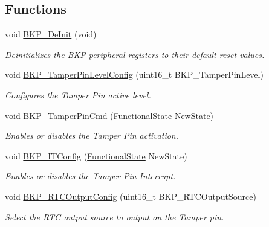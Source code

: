 \subsection*{Functions}
\begin{DoxyCompactItemize}
\item 
void \hyperlink{group___b_k_p___exported___functions_gaabff4d8f5ebf4fd9a840bcc9042ca226}{B\+K\+P\+\_\+\+De\+Init} (void)
\begin{DoxyCompactList}\small\item\em Deinitializes the B\+KP peripheral registers to their default reset values. \end{DoxyCompactList}\item 
void \hyperlink{group___b_k_p___exported___functions_gae216446d641d075fb575ce6dbe2ff4c1}{B\+K\+P\+\_\+\+Tamper\+Pin\+Level\+Config} (uint16\+\_\+t B\+K\+P\+\_\+\+Tamper\+Pin\+Level)
\begin{DoxyCompactList}\small\item\em Configures the Tamper Pin active level. \end{DoxyCompactList}\item 
void \hyperlink{group___b_k_p___exported___functions_ga3a0cdff9ad8238ade2c67e2b70f530ac}{B\+K\+P\+\_\+\+Tamper\+Pin\+Cmd} (\hyperlink{group___exported__types_gac9a7e9a35d2513ec15c3b537aaa4fba1}{Functional\+State} New\+State)
\begin{DoxyCompactList}\small\item\em Enables or disables the Tamper Pin activation. \end{DoxyCompactList}\item 
void \hyperlink{group___b_k_p___exported___functions_gab8dbd0c4773f6edb98a28c8ff6a2ead0}{B\+K\+P\+\_\+\+I\+T\+Config} (\hyperlink{group___exported__types_gac9a7e9a35d2513ec15c3b537aaa4fba1}{Functional\+State} New\+State)
\begin{DoxyCompactList}\small\item\em Enables or disables the Tamper Pin Interrupt. \end{DoxyCompactList}\item 
void \hyperlink{group___b_k_p___exported___functions_ga3d1b22b3c6a79f7b423616a0af1885bf}{B\+K\+P\+\_\+\+R\+T\+C\+Output\+Config} (uint16\+\_\+t B\+K\+P\+\_\+\+R\+T\+C\+Output\+Source)
\begin{DoxyCompactList}\small\item\em Select the R\+TC output source to output on the Tamper pin. \end{DoxyCompactList}\item 

\end{DoxyCompactItemize}
